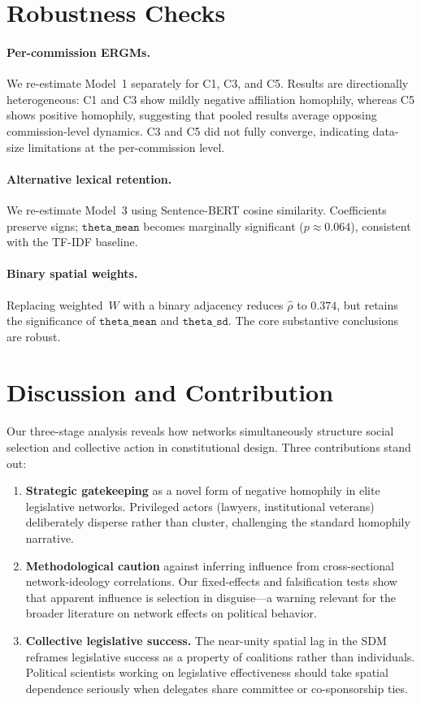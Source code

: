\documentclass[11pt,a4paper]{article}
\begin{document}
\section{Robustness Checks}

\paragraph{Per-commission ERGMs.} We re-estimate Model~1 separately for C1, C3, and C5. Results are directionally heterogeneous: C1 and C3 show mildly negative affiliation homophily, whereas C5 shows positive homophily, suggesting that pooled results average opposing commission-level dynamics. C3 and C5 did not fully converge, indicating data-size limitations at the per-commission level.

\paragraph{Alternative lexical retention.} We re-estimate Model~3 using Sentence-BERT cosine similarity. Coefficients preserve signs; $\texttt{theta\_mean}$ becomes marginally significant ($p \approx 0.064$), consistent with the TF-IDF baseline.

\paragraph{Binary spatial weights.} Replacing weighted~$W$ with a binary adjacency reduces $\hat{\rho}$ to $0.374$, but retains the significance of $\texttt{theta\_mean}$ and $\texttt{theta\_sd}$. The core substantive conclusions are robust.

\section{Discussion and Contribution}

Our three-stage analysis reveals how networks simultaneously structure social selection and collective action in constitutional design. Three contributions stand out:

\begin{enumerate}
  \item \textbf{Strategic gatekeeping} as a novel form of negative homophily in elite legislative networks. Privileged actors (lawyers, institutional veterans) deliberately disperse rather than cluster, challenging the standard homophily narrative.

  \item \textbf{Methodological caution} against inferring influence from cross-sectional network-ideology correlations. Our fixed-effects and falsification tests show that apparent influence is selection in disguise---a warning relevant for the broader literature on network effects on political behavior.

  \item \textbf{Collective legislative success.} The near-unity spatial lag in the SDM reframes legislative success as a property of coalitions rather than individuals. Political scientists working on legislative effectiveness should take spatial dependence seriously when delegates share committee or co-sponsorship ties.
\end{enumerate}
\end{document}
